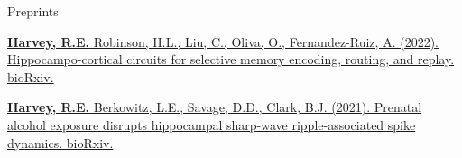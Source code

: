 


\begin{cventries}


\cventry
    {Preprints} %
    {} %
    {} %
    {} %
    {
      \begin{cvitems} %
      \setlength\itemsep{0.5em}
        \item {\href{https://doi.org/10.1101/2022.09.25.509420}{\textbf{Harvey, R.E.} Robinson, H.L., Liu, C., Oliva, O., Fernandez-Ruiz, A. (2022). Hippocampo-cortical circuits for selective memory encoding, routing, and replay. bioRxiv.}}
        \item {\href{https://doi.org/10.1101/2021.06.29.450435}{\textbf{Harvey, R.E.} Berkowitz, L.E., Savage, D.D., Clark, B.J. (2021). Prenatal alcohol exposure disrupts hippocampal sharp-wave ripple-associated spike dynamics. bioRxiv.}}
      \end{cvitems}
    }
    

\end{cventries}

